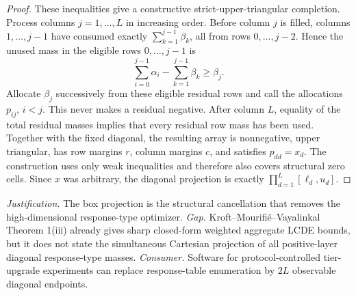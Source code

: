 \documentclass{article}
\begin{document}
\begin{proof}
These inequalities give a constructive strict-upper-triangular completion.  Process columns \(j=1,\ldots,L\) in increasing order.  Before column \(j\) is filled, columns \(1,\ldots,j-1\) have consumed exactly \(\sum_{k=1}^{j-1}\beta_k\), all from rows \(0,\ldots,j-2\).  Hence the unused mass in the eligible rows \(0,\ldots,j-1\) is
\[
 \sum_{i=0}^{j-1}\alpha_i-
 \sum_{k=1}^{j-1}\beta_k
 \ge \beta_j.
\]
Allocate \(\beta_j\) successively from these eligible residual rows and call the allocations \(p_{ij}\), \(i<j\).  This never makes a residual negative.  After column \(L\), equality of the total residual masses implies that every residual row mass has been used.  Together with the fixed diagonal, the resulting array is nonnegative, upper triangular, has row margins \(r\), column margins \(c\), and satisfies \(p_{dd}=x_d\).  The construction uses only weak inequalities and therefore also covers structural zero cells.  Since \(x\) was arbitrary, the diagonal projection is exactly \(\prod_{d=1}^{L}[\ell_d,u_d]\).
\end{proof}
\par\smallskip\noindent \textit{Justification.} The box projection is the structural cancellation that removes the high-dimensional response-type optimizer. \textit{Gap.} Kroft--Mourifi\'e--Vayalinkal Theorem 1(iii) already gives sharp closed-form weighted aggregate LCDE bounds, but it does not state the simultaneous Cartesian projection of all positive-layer diagonal response-type masses. \textit{Consumer.} Software for protocol-controlled tier-upgrade experiments can replace response-table enumeration by \(2L\) observable diagonal endpoints.
\end{document}
